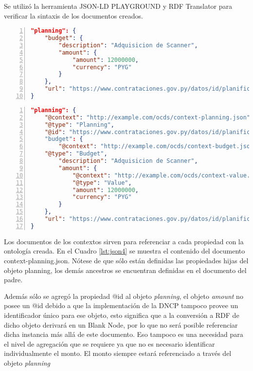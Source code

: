 Se utilizó la herramienta JSON-LD PLAYGROUND \cite{JSONLDPl78:online} y RDF Translator \cite{RDFTrans0:online} para verificar la sintaxis de los documentos creados.\hfill \break

\noindent\begin{minipage}{\textwidth}
\begin{lstlisting}[captionpos=b, caption=Objeto JSON del OCDS de un Planning, label=lst:json2,  numbers=left, language=json, firstnumber=1, numberstyle=\tiny\color{mygray},frame=single]
"planning": {
    "budget": { 
        "description": "Adquisicion de Scanner",
        "amount": {
            "amount": 12000000,
            "currency": "PYG"
        }
    },
    "url": "https://www.contrataciones.gov.py/datos/id/planificaciones/193399-adquisicion-scanner"
}
\end{lstlisting}
\end{minipage}

\hfill \break

\noindent\begin{minipage}{\textwidth}
\begin{lstlisting}[captionpos=b, caption=Objeto JSON-LD del OCDS de un Planning, label=lst:json3,  numbers=left, language=json, firstnumber=1, numberstyle=\tiny\color{mygray},frame=single]
"planning": {
    "@context": "http://example.com/ocds/context-planning.json",
    "@type": "Planning",
    "@id": "https://www.contrataciones.gov.py/datos/id/planificaciones/193399-adquisicion-scanner"
    "budget": { 
        "@context": "http://example.com/ocds/context-budget.json",
    "@type": "Budget",
        "description": "Adquisicion de Scanner",
        "amount": {
            "@context": "http://example.com/ocds/context-value.json",
            "@type": "Value",
            "amount": 12000000,
            "currency": "PYG"
        }
    },
    "url": "https://www.contrataciones.gov.py/datos/id/planificaciones/193399-adquisicion-scanner"
}
\end{lstlisting}
\end{minipage}

Los documentos de los contextos sirven para referenciar a cada propiedad con la ontología creada. En el Cuadro \ref{lst:json4} se muestra el contenido del documento context-planning.json. Nótese de que sólo están definidas las propiedades hijas del objeto planning, los demás ancestros se encuentran definidas en el documento del padre.

Además sólo se agregó la propiedad @id al objeto \textit{planning}, el objeto \textit{amount} no posee un @id debido a que la implementación de la DNCP tampoco provee un identificador único para ese objeto, esto significa que a la conversión a RDF de dicho objeto derivará en un Blank Node, por lo que no será posible referenciar dicha instancia más allá de este documento. Eso tampoco es una necesidad para el nivel de agregación que se requiere ya que no es necesario identificar individualmente el monto. El monto siempre estará referenciado a través del objeto \textit{planning}


